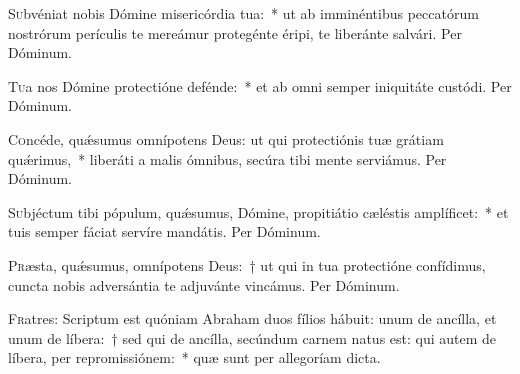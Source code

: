 \documentclass[vesperale_romanum.tex]{subfiles}
\begin{document}

\oratio

\lettrine{S}{u}bvéniat nobis Dómine misericórdia tua:~* ut ab imminéntibus peccatórum nostrórum perículis te mereámur protegénte éripi, te liberánte salvári.
Per Dóminum.



\oratio

\lettrine{T}{u}a nos Dómine protectióne defénde:~* et ab omni semper iniquitáte custódi. Per Dóminum.



\oratio

\lettrine{C}{o}ncéde, quǽsumus omnípotens Deus: ut qui protectiónis tuæ grátiam quǽrimus,~* liberáti a malis ómnibus, secúra tibi mente serviámus. Per Dóminum.



\oratio

\lettrine{S}{u}bjéctum tibi pópulum, quǽsumus, Dómine, propitiátio cæléstis amplíficet:~* et tuis semper fáciat servíre mandátis. Per Dóminum.



\oratio

\lettrine{P}{r}æsta, quǽsumus, omnípotens Deus:~† ut qui in tua protectióne confídimus, cuncta nobis adversántia te adjuvánte vincámus. Per Dóminum.



\lettrine{F}{r}atres: Scriptum est quóniam Abraham duos fílios hábuit: unum de ancílla, et unum de líbera:~† sed qui de ancílla, secúndum carnem natus est: qui autem de líbera, per repromissiónem:~* quæ sunt per allegoríam dicta.



\end{document}

